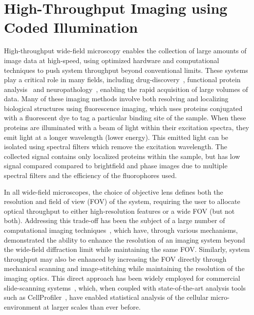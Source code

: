 \chapter{High-Throughput Imaging using Coded Illumination}\label{ch:highthroughput}

High-throughput wide-field microscopy enables the collection of large amounts of image data at high-speed, using optimized hardware and computational techniques to push system throughput beyond conventional limits. These systems play a critical role in many fields, including drug-discovery~\cite{Perlman1194, brodin2011high, bickle2010beautiful}, functional protein analysis~\cite{Liebel:03, huh2003global} and  neuropathology~\cite{peiffer1979alcohol, remmelinck2000could, alegro2017automating}, enabling the rapid acquisition of large volumes of data. Many of these imaging methods involve both resolving and localizing biological structures using fluorescence imaging, which uses proteins conjugated with a fluorescent dye to tag a particular binding site of the sample. When these proteins are illuminated with a beam of light within their excitation spectra, they emit light at a longer wavelength (lower energy). This emitted light can be isolated using spectral filters which remove the excitation wavelength. The collected signal contains only localized proteins within the sample, but has low signal compared compared to brightfield and phase images due to multiple spectral filters and the efficiency of the fluorophores used.

In all wide-field microscopes, the choice of objective lens defines both the resolution and field of view (FOV) of the system, requiring the user to allocate optical throughput to either high-resolution features or a wide FOV (but not both). Addressing this trade-off has been the subject of a large number of computational imaging techniques~\cite{Zheng2013, betzig2006imaging, Rust:06, gustafsson2000surpassing, rodenburg2004phase, Tian2014}, which have, through various mechanisms, demonstrated the ability to enhance the resolution of an imaging system beyond the wide-field diffraction limit while maintaining the same FOV. Similarly, system throughput may also be enhanced by increasing the FOV directly through mechanical scanning and image-stitching while maintaining the resolution of the imaging optics. This direct approach has been widely employed for commercial slide-scanning systems~\cite{zeissSlideScan}, which, when coupled with state-of-the-art analysis tools such as CellProfiler~\cite{Carpenter2006}, have enabled statistical analysis of the cellular micro-environment at larger scales than ever before.

